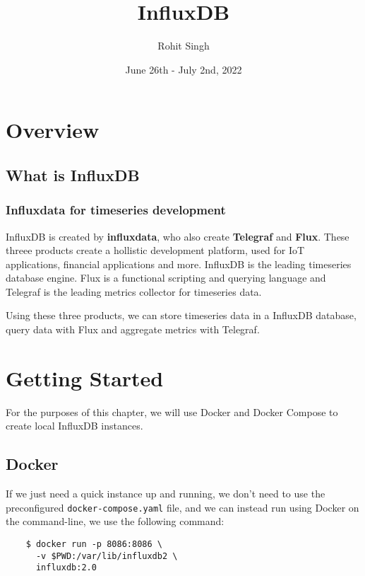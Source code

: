 \documentclass{article}
\title{InfluxDB}
\author{Rohit Singh}
\date{June 26th - July 2nd, 2022}
\begin{document}
\maketitle

\tableofcontents

\section{Overview}

\subsection{What is InfluxDB}

\subsubsection{Influxdata for timeseries development}

InfluxDB is created by \textbf{influxdata}, who also create \textbf{Telegraf} and \textbf{Flux}. These threee products create a hollistic development platform, used for IoT applications, financial applications and more. InfluxDB is the leading timeseries database engine. Flux is a functional scripting and querying language and Telegraf is the leading metrics collector for timeseries data. 

Using these three products, we can store timeseries data in a InfluxDB database, query data with Flux and aggregate metrics with Telegraf.

\section{Getting Started}\label{ref:getting-started}

For the purposes of this chapter, we will use Docker and Docker Compose to create local InfluxDB instances.

\subsection{Docker}

If we just need a quick instance up and running, we don't need to use the preconfigured \verb|docker-compose.yaml| file, and we can instead run using Docker on the command-line, we use the following command:

\begin{verbatim}
    $ docker run -p 8086:8086 \
      -v $PWD:/var/lib/influxdb2 \
      influxdb:2.0
\end{verbatim}
\end{document}
